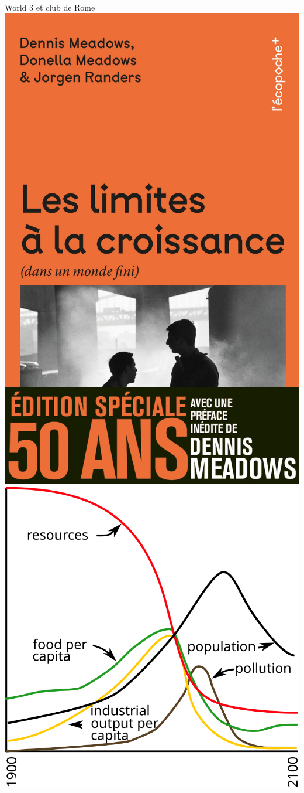 \documentclass{beamer}
\begin{document}
\begin{frame}{World 3 et club de Rome}
\includegraphics[scale=0.04]{images/limites_croissance.jpg}
\includegraphics[scale=0.1]{images/limits-to-growth-figure.png}

\end{frame}
\end{document}
